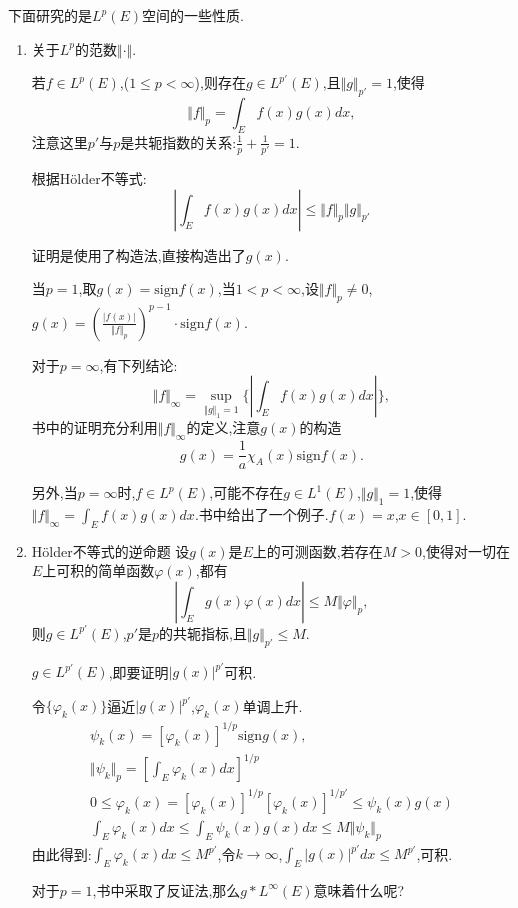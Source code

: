 \documentclass[12pt,a4paper,openany]{book}
\begin{document}
下面研究的是$L^p(E)$空间的一些性质.

\begin{enumerate}
\item 关于$L^p$的范数$\Vert\cdot\Vert$.

若$f \in L^p(E)$,($1 \le p < \infty$),则存在$g \in L^{p'}(E)$,且$\Vert{g}\Vert_{p'}=1$,使得
\[
\Vert{f}\Vert_p=\int_{E}{f(x)g(x)dx},
\]
注意这里$p'$与$p$是共轭指数的关系:$\frac{1}{p} + \frac{1}{p'} = 1$.

根据H\"older不等式:
\[
|\int_{E}{f(x)g(x)dx}| \le \Vert{f}\Vert_p\Vert{g}\Vert_{p'}
\]

证明是使用了构造法,直接构造出了$g(x)$.

当$p=1$,取$g(x)=\text{sign}{f(x)}$,当$1<p<\infty$,设$\Vert{f}\Vert_p \neq 0$,$g(x)=(\frac{|f(x)|}{\Vert{f}\Vert_p})^{p-1}\cdot\text{sign}{f(x)}$.

对于$p=\infty$,有下列结论:
\[
\Vert{f}\Vert_{\infty}=\sup_{\Vert{g}\Vert_1=1}{\{|\int_{E}{f(x)g(x)dx}|\}},
\]
书中的证明充分利用$\Vert{f}\Vert_{\infty}$的定义,注意$g(x)$的构造
\[
g(x)=\frac{1}{a}\chi_{A}(x)\text{sign}{f(x)}.
\]

另外,当$p=\infty$时,$f \in L^p(E)$,可能不存在$g \in L^1(E)$,$\Vert{g}\Vert_1=1$,使得$\Vert{f}\Vert_{\infty}=\int_{E}{f(x)g(x)dx}$.书中给出了一个例子.$f(x)=x$,$x \in [0,1]$.

\item H\"older不等式的逆命题
设$g(x)$是$E$上的可测函数,若存在$M>0$,使得对一切在$E$上可积的简单函数$\varphi(x)$,都有
\[
|\int_{E}{g(x)\varphi(x)dx}| \le M\Vert{\varphi}\Vert_p,
\]
则$g \in L^{p'}(E)$,$p'$是$p$的共轭指标,且$\Vert{g}\Vert_{p'} \le M$.

$g \in L^{p'}(E)$,即要证明$|g(x)|^{p'}$可积.

令$\{\varphi_k(x)\}$逼近$|g(x)|^{p'}$,$\varphi_k(x)$单调上升.
\begin{gather*}
\psi_k(x)=[\varphi_k(x)]^{1/p}\text{sign}{g(x)},\\
\Vert{\psi_k}\Vert_p=[\int_{E}{\varphi_k(x)dx}]^{1/p} \\
0 \le \varphi_k(x) = [\varphi_k(x)]^{1/p}[\varphi_k(x)]^{1/p'}\le \psi_k(x)g(x) \\
\int_{E}{\varphi_k(x)dx} \le \int_{E}{\psi_k(x)g(x)dx} \le M\Vert{\psi_k}\Vert_p
\end{gather*}
由此得到:$\int_{E}{\varphi_k(x)dx} \le M^{p'}$,令$k \rightarrow \infty$,$\int_{E}{|g(x)|^{p'}dx} \le M^{p'}$,可积.

对于$p=1$,书中采取了反证法,那么$g*L^{\infty}(E)$意味着什么呢?


\end{enumerate}
\end{document}
